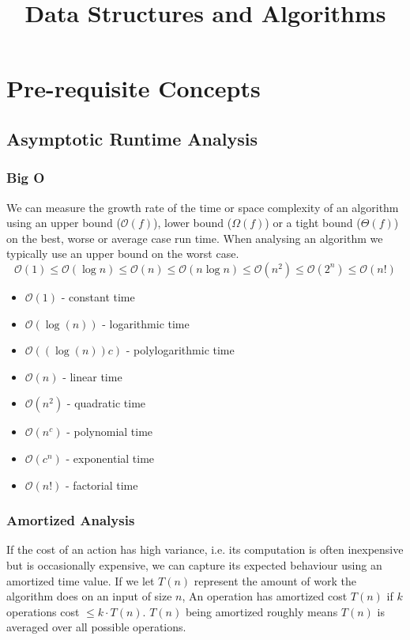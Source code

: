 \documentclass{article}
\title{\vspace{-3cm} Data Structures and Algorithms}
\author{}
\date{}
\newcommand{\bigO}{\mathcal{O}}
\begin{document}
\maketitle
\vspace{-1.5cm}
\tableofcontents
\newpage

\section{Pre-requisite Concepts}

    \subsection{Asymptotic Runtime Analysis}
    \subsubsection{Big O}
    We can measure the growth rate of the time or space complexity of an algorithm using an upper bound ($\bigO(f)$), lower bound ($\Omega (f) $) or a tight bound ($\Theta (f)$) on the best, worse or average case run time. When analysing an algorithm we typically use an upper bound on the worst case. 
    \[
        \bigO(1) \leq \bigO(\log n) \leq \bigO(n) \leq \bigO(n \log n) \leq \bigO(n^2) \leq  \bigO(2^n)  \leq \bigO(n!)
    \]
    \begin{multicols}{2}
    \begin{itemize}
        \item[] $\bigO(1)$ - constant time
        \item[] $\bigO(\log(n))$ - logarithmic time
        \item[] $\bigO((\log(n))c)$ - polylogarithmic time
        \item[] $\bigO(n)$ - linear time
        \item[] $\bigO(n^2)$ - quadratic time
        \item[] $\bigO(n^c)$ - polynomial time
        \item[] $\bigO(c^n)$ - exponential time
        \item[] $\bigO(n!)$ - factorial time
    \end{itemize}
    \end{multicols}
    
    \subsubsection{Amortized Analysis}
    If the cost of an action has high variance, i.e. its computation is often inexpensive but is occasionally expensive, we can capture its expected behaviour using an amortized time value. If we let $T(n)$ represent the amount of work the algorithm does on an input of size $n$, An operation has amortized cost $T(n)$ if $k$ operations cost $\leq k \cdot T(n)$. $T(n)$ being amortized roughly means $T(n)$ is averaged over all possible operations. 
    
\end{document}
